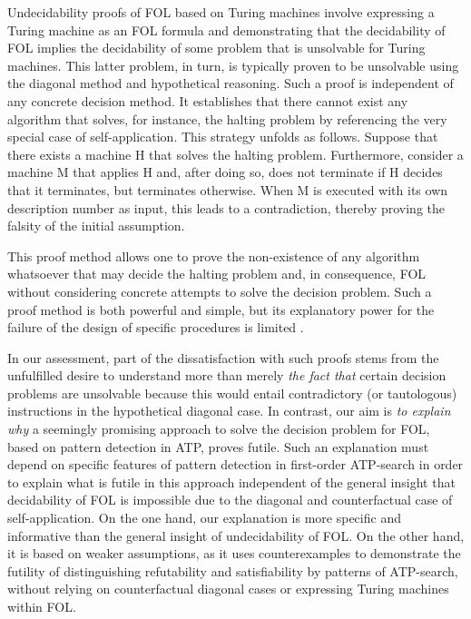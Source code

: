 \documentclass[%
  manuscript=article,   %
  year=2024,
  volume=77,
  doi=00000.000,
]{zfn}
\begin{document}
Undecidability proofs of FOL based on Turing machines involve expressing
a Turing machine as an FOL formula and demonstrating that the decidability of FOL implies the decidability of some problem that is unsolvable for Turing machines. This latter problem, in turn, is typically proven to be unsolvable using the diagonal method and hypothetical reasoning. Such a proof is independent of any concrete decision method. It establishes that there cannot exist any algorithm that solves, for instance, the halting problem by referencing the very special case of self-application. This strategy unfolds as follows. Suppose that there exists a machine H that solves the halting problem. Furthermore, consider a machine M that applies H and, after doing so, does not terminate if H decides that it terminates, but terminates otherwise. When M is executed with its own description number as input, this leads to a contradiction, thereby proving the falsity of the initial assumption.

This proof method allows one to prove the non-existence of any algorithm whatsoever that may decide the halting problem and, in consequence, FOL without considering concrete attempts to solve the decision problem. Such a proof method is both powerful and simple, but its explanatory power for the failure of the design of specific procedures is limited \parencite[cf.][246;  for reservations against his own method]{Turing}.

In our assessment, part of the dissatisfaction with such proofs stems from the unfulfilled desire to understand more than merely \emph{the fact that} certain decision problems are unsolvable because this would entail contradictory (or tautologous) instructions in the hypothetical diagonal case.
In contrast, our aim is \emph{to explain why} a seemingly promising
approach to solve the decision problem for FOL, based on pattern detection in ATP, proves futile. Such an explanation must depend on specific features of pattern detection in first-order ATP-search in order to explain what is futile in this approach independent of the general insight that decidability of FOL is impossible due to the diagonal and counterfactual case of self-application. On the one hand, our explanation is more specific and informative than the general insight of undecidability of FOL. On the other hand, it is based on weaker assumptions, as it uses counterexamples to demonstrate the futility of distinguishing refutability and satisfiability by patterns of ATP-search, without relying on counterfactual diagonal cases or expressing Turing machines within FOL.
\end{document}
